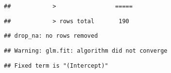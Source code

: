 \documentclass[
]{article}
\begin{document}
\begin{verbatim}
##            >                 =====
\end{verbatim}

\begin{verbatim}
##            > rows total       190
\end{verbatim}

\begin{verbatim}
## drop_na: no rows removed
\end{verbatim}

\begin{verbatim}
## Warning: glm.fit: algorithm did not converge
\end{verbatim}

\begin{verbatim}
## Fixed term is "(Intercept)"
\end{verbatim}
\end{document}
